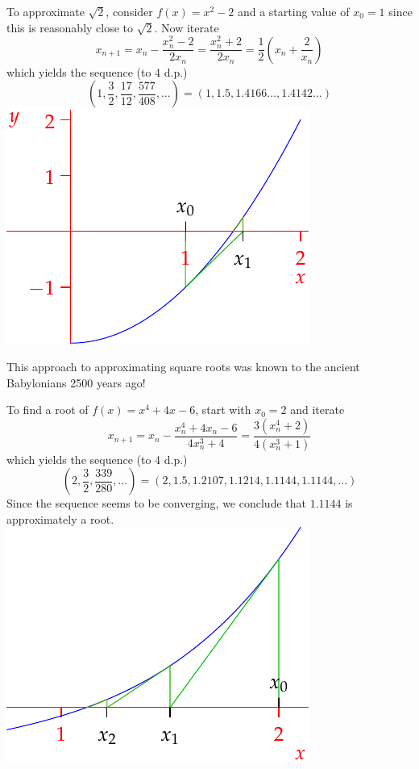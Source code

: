 \begin{example}[lower separated=false, sidebyside, sidebyside align=top seam, sidebyside gap=0pt, righthand width=0.4\linewidth]{}{}
To approximate $\sqrt 2$, consider $f(x)=x^2-2$ and a starting value of $x_0=1$ since this is reasonably close to $\sqrt 2$. Now iterate
\[x_{n+1}=x_n-\frac{x_n^2-2}{2x_n}=\frac{x_n^2+2}{2x_n} =\frac 12\left(x_n+\frac 2{x_n}\right)\]
which yields the sequence (to 4 d.p.)
\[\left(1,\frac 32,\frac{17}{12},\frac{577}{408},\ldots\right)=(1,1.5,1.4166\ldots,1.4142\ldots)\]
\tcblower
\flushright\includegraphics{newton-raphson}
\end{example}

This approach to approximating square roots was known to the ancient Babylonians 2500 years ago!

\begin{example}[lower separated=false, sidebyside, sidebyside align=top seam, sidebyside gap=0pt, righthand width=0.4\linewidth]{}{}
To find a root of $f(x)=x^4+4x-6$, start with $x_0=2$ and iterate
\[x_{n+1}=x_n-\frac{x_n^4+4x_n-6}{4x_n^3+4} =\frac{3(x_n^4+2)}{4(x_n^3+1)}\]
which yields the sequence (to 4 d.p.)
\[\left(2,\frac 32,\frac{339}{280},\ldots\right)=(2,1.5,1.2107,1.1214,1.1144,1.1144,\ldots)\]
Since the sequence seems to be converging, we conclude that $1.1144$ is approximately a root.
\tcblower
\flushright\includegraphics{newton-raphson2}
\end{example}

